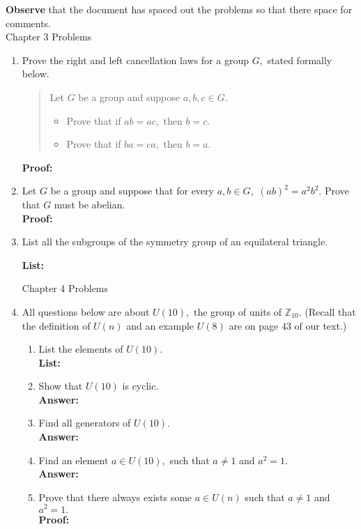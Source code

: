 \documentclass[12pt]{article}
\newcommand{\bbZ}{\mathbb{Z}}
\begin{document}
\textbf{Observe} that the document has spaced out the problems so that there space for comments.\\

Chapter 3 Problems\\

\begin{enumerate}
\item Prove the right and left cancellation laws for a group $G,$ stated formally below.

\begin{quote} Let $G$ be a group and suppose $a,b,c \in G.$
\begin{itemize}
\item Prove that if $ab=ac,$ then $b=c.$
\item Prove that if $ba=ca,$ then $b=a.$
\end{itemize}
\end{quote}

\textbf{Proof:}

\newpage

\item Let $G$ be a group and suppose that for every $a,b \in G,$ $(ab)^2=a^2b^2.$ Prove that $G$ must be abelian.\\

\textbf{Proof:}
\newpage

\item List all the subgroups of the symmetry group of an equilateral triangle.

\textbf{List:}
\newpage

Chapter 4 Problems

\item All questions below are about $U(10),$ the group of units of $\bbZ_{10}.$ (Recall that the definition of $U(n)$ and an example $U(8)$ are on page 43 of our text.)
\begin{enumerate}
	\item List the elements of $U(10).$\\
	\textbf{List:} \\
	\item Show that $U(10)$ is cyclic.\\
	\textbf{Answer:} \\
	\item Find all generators of $U(10).$\\
	\textbf{Answer:} \\
	\item Find an element $a \in U(10),$ such that $a \not = 1$ and $a^2=1.$\\
	\textbf{Answer:} \\
	\item Prove that there always exists some $a \in U(n)$ such that $a \not = 1$ and $a^2=1.$\\
	\textbf{Proof:} \\
\end{enumerate}
\newpage


\end{enumerate}
\end{document}
